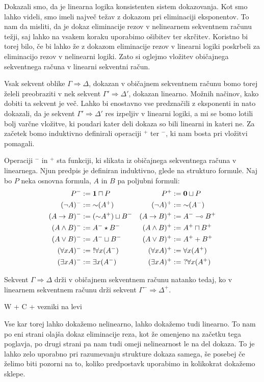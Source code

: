 Dokazali smo, da je linearna logika konsistenten sistem dokazovanja. Kot smo lahko videli, smo imeli največ težav z dokazom pri eliminaciji eksponentov. To nam da misliti, da je dokaz eliminacije rezov v nelinearnem sekventnem računu težji, saj lahko na vsakem koraku uporabimo ošibitev ter skrčitev. Koristno bi torej bilo, če bi lahko že z dokazom eliminacije rezov v linearni logiki poskrbeli za eliminacijo rezov v nelinearni logiki. Zato si oglejmo vložitev običajnega sekventnega računa v linearni sekventni račun.

Vsak sekvent oblike $\Gamma \Rightarrow \Delta$, dokazan v običajnem sekventnem računu bomo torej želeli preobraziti v nek sekvent $\Gamma' \Rightarrow \Delta'$, dokazan linearno. Možnih načinov, kako dobiti ta sekvent je več. Lahko bi enostavno vse predznačili z eksponenti in nato dokazali, da je sekvent $\Gamma' \Rightarrow \Delta'$ res izpeljiv v linearni logiki, a mi se bomo lotili bolj varčne vložitve, ki poudari kater deli dokaza so bili linearni in kateri ne. Za začetek bomo induktivno definirali operaciji $^+$ ter $^-$, ki nam bosta pri vložitvi pomagali.
\begin{definicija}
    Operaciji $^-$ in $^+$ sta funkciji, ki slikata iz običajnega sekventnega računa v linearnega. Njun predpis je definiran induktivno, glede na strukturo formule. Naj bo $P$ neka osnovna formula, $A$ in $B$ pa poljubni formuli:
    \begin{align*}
        P^- &:= \mathbf{1}\sqcap P & P^+ &:= \mathbf{0}\sqcup P\\
        (\neg A)^- &:= \mathord{\sim}(A^+) & (\neg A)^+ &:= \mathord{\sim}(A^-)\\
        (A\rightarrow B)^- &:= (\mathord{\sim} A^+)\sqcup B^- & (A\rightarrow B)^+ &:= A^-\multimap B^+\\
        (A\land B)^- &:= A^-\star B^- & (A\land B)^+ &:= A^+\sqcap B^+\\
        (A\lor B)^- &:= A^-\sqcup B^- & (A\lor B)^+ &:= A^++ B^+\\
        (\forall x A)^- &:=\ !\forall x (A^-) & (\forall x A)^+ &:= \forall x (A^+)\\
        (\exists x A)^- &:= \exists x (A^-) & (\exists x A)^+ &:=\ ?\forall x (A^+)
    \end{align*}
\end{definicija}

\begin{izrek}
    Sekvent $\Gamma \Rightarrow \Delta$ drži v običajnem sekventnem računu natanko tedaj, ko v linearnem sekventnem računu drži sekvent $\Gamma^- \Rightarrow \Delta^+$.
\end{izrek}
\begin{dokaz}
    W + C + vezniki na levi
\end{dokaz}

Vse kar torej lahko dokažemo nelinearno, lahko dokažemo tudi linearno. To nam po eni strani olajša dokaz eliminacije reza, kot že omenjeno na začetku tega poglavja, po drugi strani pa nam tudi omeji nelinearnost le na del dokaza. To je lahko zelo uporabno pri razumevanju strukture dokaza samega, še posebej če želimo biti pozorni na to, koliko predpostavk uporabimo in kolikokrat dokažemo sklepe.
